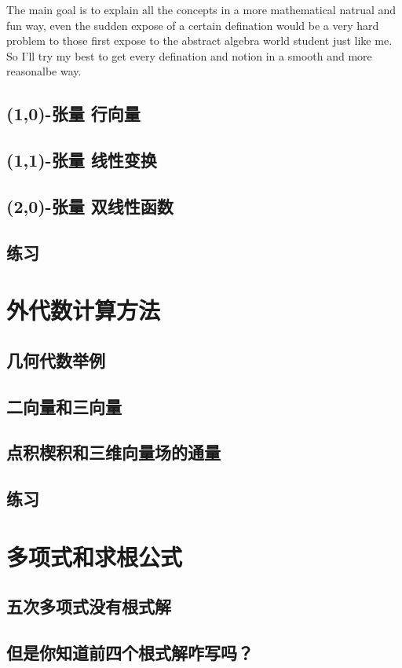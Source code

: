 \documentclass{book}
\begin{document}
\begin{CJK}{UTF8}{gbsn}
    The main goal is to explain all the concepts in a
    more mathematical natrual and fun way, even the sudden
    expose of a certain defination would be a very hard
    problem to those first expose to the abstract algebra
    world student just like me. So I'll try my best to
    get every defination and notion in a smooth and more
    reasonalbe way.
    \subsection{(1,0)-张量 行向量}
    \subsection{(1,1)-张量 线性变换}
    \subsection{(2,0)-张量 双线性函数}
    \subsection{练习}
    \section{外代数计算方法}
    \subsection{几何代数举例}
    \subsection{二向量和三向量}
    \subsection{点积楔积和三维向量场的通量}
    \subsection{练习}
    \section{多项式和求根公式}
    \subsection{五次多项式没有根式解}
    \subsection{但是你知道前四个根式解咋写吗？}

\end{CJK}
\end{document}
